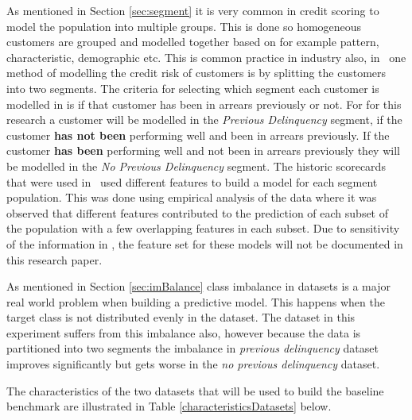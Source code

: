 As mentioned in Section \ref{sec:segment} it is very common in credit scoring to model the population into multiple groups. This is done so homogeneous customers are grouped and modelled together based on for example pattern, characteristic, demographic etc. This is common practice in industry also, in \subjectname\ one method of modelling the credit risk of customers is by splitting the customers into two segments. The criteria for selecting which segment each customer is modelled in is if that customer has been in arrears previously or not. For for this research a customer will be modelled in the \textit{Previous Delinquency} segment, if the customer \textbf{has not been} performing well and been in arrears previously. If the customer \textbf{has been} performing well and not been in arrears previously they will be modelled in the \textit{No Previous Delinquency} segment. The historic scorecards that were used in \subjectname\ used different features to build a model for each segment population. This was done using empirical analysis of the data where it was observed that different features contributed to the prediction of each subset of the population with a few overlapping features in each subset. Due to sensitivity of the information in \subjectname, the feature set for these models will not be documented in this research paper.

As mentioned in Section \ref{sec:imBalance} class imbalance in datasets is a major real world problem when building a predictive model. This happens when the target class is not distributed evenly in the dataset. The dataset in this experiment suffers from this imbalance also, however because the data is partitioned into two segments the imbalance in \textit{previous delinquency} dataset improves significantly but gets worse in the \textit{no previous delinquency} dataset.

The characteristics of the two datasets that will be used to build the baseline benchmark are illustrated in Table \ref{characteristicsDatasets} below.

